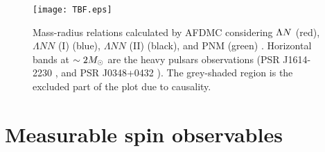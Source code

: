 \begin{figure}[h]
  \begin{center}
   \texttt{[image: TBF.eps]}
   \caption{Mass-radius relations calculated by AFDMC considering $\Lambda N$ (red), $\Lambda NN$ (I) (blue), $\Lambda NN$ (II) (black), and PNM (green) \cite{Diego-2015}. Horizontal bands at $\sim2M_\odot$ are the heavy pulsars observations (PSR J1614-2230 \cite{NS-1}, and PSR J0348+0432 \cite{NS-2}). The grey-shaded region is the excluded part of the plot due to causality.}
   \label{fig-TBF}
 \end{center}
\end{figure}






\clearpage
\section{Measurable spin observables}

\begin{comment}
\subsection{Differential cross-section}
To experimentally obtain information on the two-body interaction potential, measuring the differential cross-section $d\sigma/d\Omega$ and determining its scattering phase difference $\delta$ is necessary. The differential cross-section derived from the scattering amplitude $f(\theta)$ expanded by the orbital angular momentum $l$ is given by 
\begin{equation}
  \frac{d\sigma}{d\Omega}(\theta) = |f(\theta)|^2 = \left| \cfrac{1}{k}\sum_{l=0}^\infty (2l+1)e^{i\delta_l}\sin\delta_l P_l (\cos\theta)\right|^2,
  \label{eq: potential}
\end{equation}
where $k$ is the wavenumber, $P_l$ is the $l^{\rm th}$ Legendre polynomial, and spin weights are not considered. $\delta_l$ is the phase difference between the waves scattered by the potential of a partial wave with angular momentum $l$ and unscattered waves. When $\delta_l<0$, the potential is repulsive, and when $\delta_l>0$, the potential is attractive.

For the $\LN$ interaction, the contribution of the (${\bf 27}$) term in the spin-singlet can be estimated from the abundant experimental data of $NN$ scattering as in the $\SN$ interaction. The theoretical indeterminacy of the phase difference in the (${\bf 27}$) is expected to be very small. The spin-singlet and spin-triplet contributions can be constrained if the J-PARC E40 experiment determines the $\SN$ interaction.
\end{comment}

